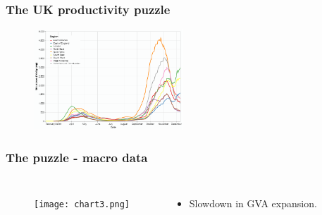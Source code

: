 \documentclass{beamer}
\begin{document}
\begin{frame}
\frametitle{The UK productivity puzzle}

\begin{figure}
\centering
\includegraphics[width=0.5\textwidth]{chart1.PNG}
\end{figure}

\href{https://www.rapidcharts.io/productivity}{}

\end{frame}


\begin{frame}
\frametitle{The puzzle - macro data}

\begin{columns}


\begin{figure}
\centering
\texttt{[image: chart3.png]}
\end{figure}


\begin{itemize}
\item Slowdown in GVA expansion.


\end{itemize}
\end{columns}
\end{frame}
\end{document}
